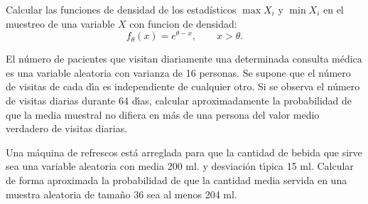 \begin{ejercicio}
    Calcular las funciones de densidad de los estadísticos $\max X_i$ y $\min X_i$ en el muestreo de una variable $X$ con funcion de densidad:
    \begin{equation*}
        f_\theta(x) = e^{\theta-x}, \qquad x>\theta.
    \end{equation*}
\end{ejercicio}

\begin{ejercicio}
    El número de pacientes que visitan diariamente una determinada consulta médica es una variable aleatoria con varianza de 16 personas. Se supone que el número de visitas de cada dı́a es independiente de cualquier otro. Si se observa el número de visitas diarias durante 64 dı́as, calcular aproximadamente la probabilidad de que la media muestral no difiera en más de una persona del valor medio verdadero de visitas diarias.
\end{ejercicio}

\begin{ejercicio}
    Una máquina de refrescos está arreglada para que la cantidad de bebida que sirve sea una variable aleatoria con media 200 ml. y desviación tı́pica 15 ml. Calcular de forma aproximada la probabilidad de que la cantidad media servida en una muestra aleatoria de tamaño 36 sea al menos 204 ml.
\end{ejercicio}

